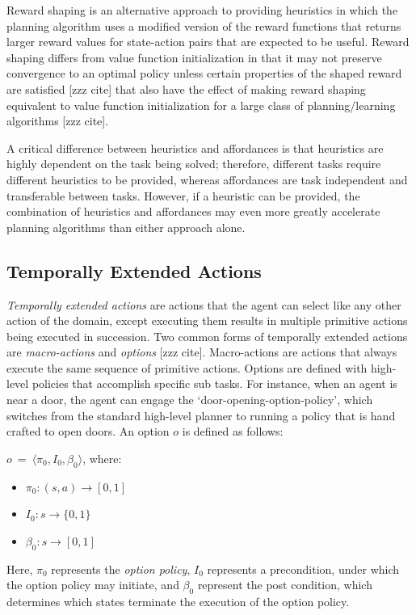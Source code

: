\documentclass[]{article}
\begin{document}
Reward shaping is an alternative approach to providing heuristics in which the planning algorithm uses a modified version of the reward functions that returns larger reward values for state-action pairs that are expected to be useful. Reward shaping differs from value function initialization in that it may not preserve convergence to an optimal policy unless certain properties of the shaped reward are satisfied [zzz cite] that also have the effect of making reward shaping equivalent to value function initialization for a large class of planning/learning algorithms [zzz cite].

A critical difference between heuristics and affordances is that heuristics are highly dependent on the task being solved; therefore, different tasks require different heuristics to be provided, whereas affordances are task independent and transferable between tasks. However, if a heuristic can be provided, the combination of heuristics and affordances may even more greatly accelerate planning algorithms than either approach alone.


\subsection{Temporally Extended Actions}

{\em Temporally extended actions} are actions that the agent can select like any other action
of the domain, except executing them results in multiple primitive actions being executed
in succession. Two common forms of temporally extended actions are {\em macro-actions} and {\em options}
[zzz cite]. Macro-actions are actions that always execute the same sequence of primitive actions. Options 
are defined with high-level policies that 
accomplish specific sub tasks. For instance, when an agent is near 
a door, the agent can engage the `door-opening-option-policy', which 
switches from the standard high-level planner to running a policy 
that is hand crafted to open doors. An option $o$ is defined as follows:

$o\ =\ \langle \pi_0, I_0, \beta_0\rangle$, where:

\begin{itemize}
\item[] $\pi_0 : (s,a) \rightarrow [0,1]$
\item[] $I_0 : s \rightarrow \{0,1\}$
\item[] $\beta_0 : s \rightarrow [0,1]$
\end{itemize}

Here, $\pi_0$ represents the {\it option policy}, $I_0$ represents
a precondition, under which the option policy may initiate, and 
$\beta_0$ represent the post condition, which determines which 
states terminate the execution of the option policy.
\end{document}
